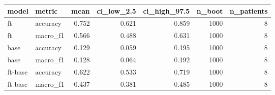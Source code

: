 \begin{tabular}{llrrrrr}
\toprule
model & metric & mean & ci\_low\_2.5 & ci\_high\_97.5 & n\_boot & n\_patients \\
\midrule
ft & accuracy & 0.752 & 0.621 & 0.859 & 1000 & 8 \\
ft & macro\_f1 & 0.566 & 0.488 & 0.631 & 1000 & 8 \\
base & accuracy & 0.129 & 0.059 & 0.195 & 1000 & 8 \\
base & macro\_f1 & 0.128 & 0.064 & 0.192 & 1000 & 8 \\
ft-base & accuracy & 0.622 & 0.533 & 0.719 & 1000 & 8 \\
ft-base & macro\_f1 & 0.437 & 0.381 & 0.485 & 1000 & 8 \\
\bottomrule
\end{tabular}
